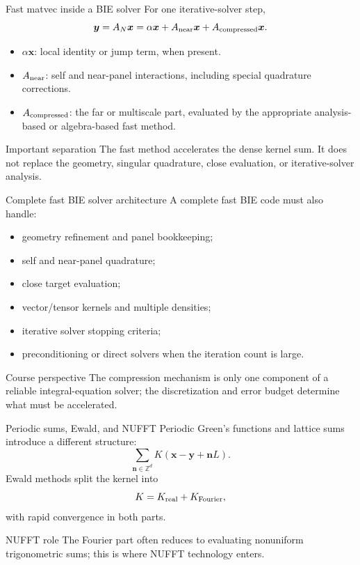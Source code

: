\documentclass[aspectratio=169,11pt]{beamer}
\newcommand{\x}{\bm{x}}
\newcommand{\y}{\bm{y}}
\begin{document}
\begin{frame}{Fast matvec inside a BIE solver}
\small
For one iterative-solver step,
\[
  \bm y=A_N\bm x
  =\alpha\bm x+A_{\rm near}\bm x+A_{\rm compressed}\bm x.
\]
\begin{itemize}
  \item $\alpha\bm x$: local identity or jump term, when present.
  \item $A_{\rm near}$: self and near-panel interactions, including special
  quadrature corrections.
  \item $A_{\rm compressed}$: the far or multiscale part, evaluated by the
  appropriate analysis-based or algebra-based fast method.
\end{itemize}
\begin{block}{Important separation}
The fast method accelerates the dense kernel sum.  It does not replace the
geometry, singular quadrature, close evaluation, or iterative-solver analysis.
\end{block}
\end{frame}

\begin{frame}{Complete fast BIE solver architecture}
\small
A complete fast BIE code must also handle:
\begin{itemize}
  \item geometry refinement and panel bookkeeping;
  \item self and near-panel quadrature;
  \item close target evaluation;
  \item vector/tensor kernels and multiple densities;
  \item iterative solver stopping criteria;
  \item preconditioning or direct solvers when the iteration count is large.
\end{itemize}
\begin{block}{Course perspective}
The compression mechanism is only one component of a reliable integral-equation
solver; the discretization and error budget determine what must be accelerated.
\end{block}
\end{frame}

\begin{frame}{Periodic sums, Ewald, and NUFFT}
\small
Periodic Green's functions and lattice sums introduce a different structure:
\[
\sum_{\bm n\in\mathbb{Z}^d}
K(\x-\y+\bm n L).
\]
Ewald methods split the kernel into
\[
K=K_{\rm real}+K_{\rm Fourier},
\]
with rapid convergence in both parts.

\begin{block}{NUFFT role}
The Fourier part often reduces to evaluating nonuniform trigonometric sums;
this is where NUFFT technology enters.
\end{block}
\end{frame}
\end{document}
